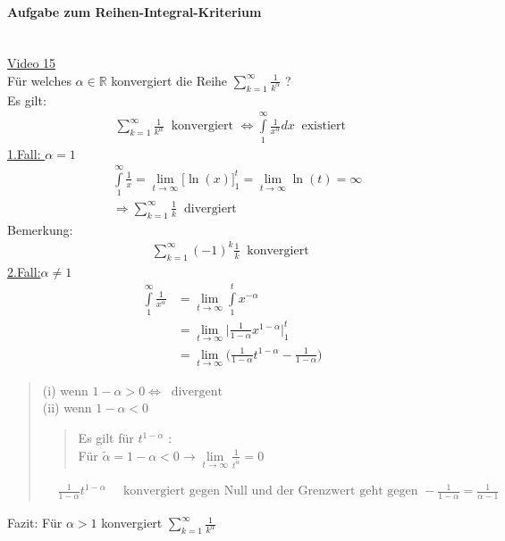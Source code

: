 \paragraph{Aufgabe zum Reihen-Integral-Kriterium}$  $\vspace*{3mm}\\
\href{https://youtu.be/x0s61IXjBKI}{Video 15}\\
Für welches $ \alpha\in\mathbb{R} $ konvergiert die Reihe $ \sum\limits_{k=1}^{\infty}\frac{1}{k^{\alpha}} $ ?\\
\renewcommand{\baselinestretch}{1.0}\normalsize
Es gilt:\\
\begin{align*}
\sum\limits_{k=1}^{\infty}\frac{1}{k^{\alpha}}\;\;\text{konvergiert }\Leftrightarrow\int\limits_{1}^{\infty}\frac{1}{x^{\alpha}} dx\;\;\text{existiert }
\end{align*}
\underline{1.Fall: $ \alpha=1 $}\\
\begin{align*}
&\int\limits_{1}^{\infty} \frac{1}{x}=\lim\limits_ {t\to\infty}\big[\ln(x)\big]_1^t=\lim\limits_ {t\to\infty}\ln(t)=\infty\\
&\Rightarrow \sum\limits_{k=1}^{\infty}\frac{1}{k}\;\;\text{divergiert }
\end{align*}
Bemerkung:\\
\begin{align*}
\sum\limits_{k=1}^{\infty}(-1)^k\frac{1}{k}\;\;\text{konvergiert }
\end{align*}
\underline{2.Fall:$ \alpha\neq 1 $}\\
\begin{align*}
\int\limits_{1}^{\infty} \frac{1}{x^{\alpha}}&=\lim\limits_ {t\to\infty}\int\limits_{1}^{t} x^{-\alpha}\\
&=\lim\limits_ {t\to\infty}\bigg|\frac{1}{1-\alpha}x^{1-\alpha}\bigg|_1^t\\
&=\lim\limits_ {t\to\infty}\bigg(\frac{1}{1-\alpha}t^{1-\alpha}-\frac{1}{1-\alpha}\bigg)
\end{align*}
\begin{quote}
	(i)\; wenn $ 1-\alpha>0 \Leftrightarrow\;\;\text{divergent }$\\
	(ii) wenn $ 1-\alpha<0 $
	\begin{quote}
		Es gilt für $ t^{1-\alpha} $ :\\
		Für $ \tilde{\alpha}=1-\alpha< 0\rightarrow \lim\limits_ {t\to\infty}\frac{1}{t^{\tilde{\alpha}}}=0$
	\end{quote}
	
	\begin{align*}
	&\frac{1}{1-\alpha}t^{1-\alpha}\;\;
	&\text{konvergiert gegen Null und der Grenzwert geht gegen } -\frac{1}{1-\alpha}=\frac{1}{\alpha-1}
	\end{align*}
\end{quote}
Fazit: Für $ \alpha>1 $ konvergiert $ \sum\limits_{k=1}^{\infty}\frac{1}{k^{\alpha}} $

